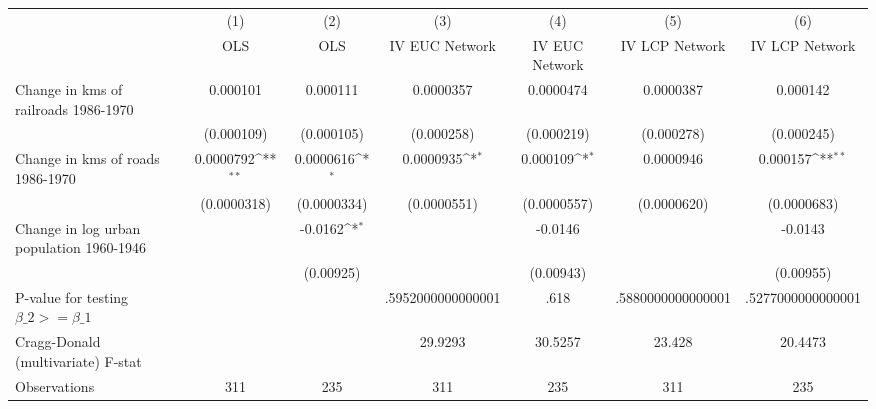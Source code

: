 {
\def\sym#1{\ifmmode^{#1}\else\(^{#1}\)\fi}
\begin{tabular}{l*{6}{c}}
\hline\hline
                &\multicolumn{1}{c}{(1)}&\multicolumn{1}{c}{(2)}&\multicolumn{1}{c}{(3)}&\multicolumn{1}{c}{(4)}&\multicolumn{1}{c}{(5)}&\multicolumn{1}{c}{(6)}\\
                &\multicolumn{1}{c}{OLS}&\multicolumn{1}{c}{OLS}&\multicolumn{1}{c}{IV EUC Network}&\multicolumn{1}{c}{IV EUC Network}&\multicolumn{1}{c}{IV LCP Network}&\multicolumn{1}{c}{IV LCP Network}\\
\hline
Change in kms of railroads 1986-1970& 0.000101         & 0.000111         &0.0000357         &0.0000474         &0.0000387         & 0.000142         \\
                &(0.000109)         &(0.000105)         &(0.000258)         &(0.000219)         &(0.000278)         &(0.000245)         \\
[1em]
Change in kms of roads 1986-1970&0.0000792\sym{**} &0.0000616\sym{*}  &0.0000935\sym{*}  & 0.000109\sym{*}  &0.0000946         & 0.000157\sym{**} \\
                &(0.0000318)         &(0.0000334)         &(0.0000551)         &(0.0000557)         &(0.0000620)         &(0.0000683)         \\
[1em]
Change in log urban population 1960-1946&                  &  -0.0162\sym{*}  &                  &  -0.0146         &                  &  -0.0143         \\
                &                  &(0.00925)         &                  &(0.00943)         &                  &(0.00955)         \\
\hline
P-value for testing $\beta\_{2} >= \beta\_{1}$&                  &                  &.5952000000000001         &     .618         &.5880000000000001         &.5277000000000001         \\
Cragg-Donald (multivariate) F-stat&                  &                  &  29.9293         &  30.5257         &   23.428         &  20.4473         \\
Observations    &      311         &      235         &      311         &      235         &      311         &      235         \\
\hline\hline
\end{tabular}
}

